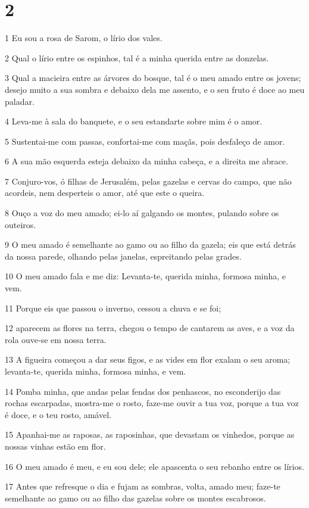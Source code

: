 \chapter{2}

\par 1 Eu sou a rosa de Sarom, o lírio dos vales.
\par 2 Qual o lírio entre os espinhos, tal é a minha querida entre as donzelas.
\par 3 Qual a macieira entre as árvores do bosque, tal é o meu amado entre os jovens; desejo muito a sua sombra e debaixo dela me assento, e o seu fruto é doce ao meu paladar.
\par 4 Leva-me à sala do banquete, e o seu estandarte sobre mim é o amor.
\par 5 Sustentai-me com passas, confortai-me com maçãs, pois desfaleço de amor.
\par 6 A sua mão esquerda esteja debaixo da minha cabeça, e a direita me abrace.
\par 7 Conjuro-vos, ó filhas de Jerusalém, pelas gazelas e cervas do campo, que não acordeis, nem desperteis o amor, até que este o queira.
\par 8 Ouço a voz do meu amado; ei-lo aí galgando os montes, pulando sobre os outeiros.
\par 9 O meu amado é semelhante ao gamo ou ao filho da gazela; eis que está detrás da nossa parede, olhando pelas janelas, espreitando pelas grades.
\par 10 O meu amado fala e me diz: Levanta-te, querida minha, formosa minha, e vem.
\par 11 Porque eis que passou o inverno, cessou a chuva e se foi;
\par 12 aparecem as flores na terra, chegou o tempo de cantarem as aves, e a voz da rola ouve-se em nossa terra.
\par 13 A figueira começou a dar seus figos, e as vides em flor exalam o seu aroma; levanta-te, querida minha, formosa minha, e vem.
\par 14 Pomba minha, que andas pelas fendas dos penhascos, no esconderijo das rochas escarpadas, mostra-me o rosto, faze-me ouvir a tua voz, porque a tua voz é doce, e o teu rosto, amável.
\par 15 Apanhai-me as raposas, as raposinhas, que devastam os vinhedos, porque as nossas vinhas estão em flor.
\par 16 O meu amado é meu, e eu sou dele; ele apascenta o seu rebanho entre os lírios.
\par 17 Antes que refresque o dia e fujam as sombras, volta, amado meu; faze-te semelhante ao gamo ou ao filho das gazelas sobre os montes escabrosos.

